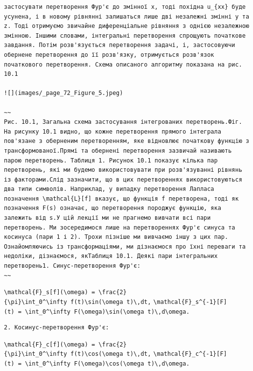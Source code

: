\documentclass[
  ukrainian,
]{article}
\begin{document}
\begin{verbatim}
застосувати перетворення Фур'є до змінної x, тоді похідна u_{xx} буде усунена, і в новому рівнянні залишаться лише дві незалежні змінні y та z. Тоді отримуємо звичайне диференціальне рівняння з однією незалежною змінною. Іншими словами, інтегральні перетворення спрощують початкове завдання. Потім розв'язується перетворення задачі, і, застосовуючи обернене перетворення до її розв'язку, отримується розв'язок початкового перетворення. Схема описаного алгоритму показана на рис. 10.1

![](images/_page_72_Figure_5.jpeg)

~~
Рис. 10.1, Загальна схема застосування інтегрованих перетворень.Фіг. На рисунку 10.1 видно, що кожне перетворення прямого інтеграла пов'язане з оберненим перетворенням, яке відновлює початкову функцію з трансформованої.Прямі та обернені перетворення зазвичай називають парою перетворень. Таблиця 1. Рисунок 10.1 показує кілька пар перетворень, які ми будемо використовувати при розв'язуванні рівнянь із факторами.Слід зазначити, що в цих перетвореннях використовуються два типи символів. Наприклад, у випадку перетворення Лапласа позначення \mathcal{L}[f] вказує, що функція f перетворена, тоді як позначення F(s) означає, що перетворення породжує функцію, яка залежить від s.У цій лекції ми не прагнемо вивчати всі пари перетворень. Ми зосередимося лише на перетвореннях Фур'є синуса та косинуса (пари 1 і 2). Трохи пізніше ми вивчаємо іншу з цих пар. Ознайомляючись із трансформаціями, ми дізнаємося про їхні переваги та недоліки, дізнаємося, якТаблиця 10.1. Деякі пари інтегральних перетворень1. Синус-перетворення Фур'є:
~~
\end{verbatim}

\texttt{\textbackslash{}mathcal\{F\}\_s{[}f{]}(\textbackslash{}omega)\ =\ \textbackslash{}frac\{2\}\{\textbackslash{}pi\}\textbackslash{}int\_0\^{}\textbackslash{}infty\ f(t)\textbackslash{}sin(\textbackslash{}omega\ t)\textbackslash{},dt,}
\texttt{\textbackslash{}mathcal\{F\}\_s\^{}\{-1\}{[}F{]}(t)\ =\ \textbackslash{}int\_0\^{}\textbackslash{}infty\ F(\textbackslash{}omega)\textbackslash{}sin(\textbackslash{}omega\ t)\textbackslash{},d\textbackslash{}omega.}

\begin{verbatim}
2. Косинус-перетворення Фур'є:
\end{verbatim}

\texttt{\textbackslash{}mathcal\{F\}\_c{[}f{]}(\textbackslash{}omega)\ =\ \textbackslash{}frac\{2\}\{\textbackslash{}pi\}\textbackslash{}int\_0\^{}\textbackslash{}infty\ f(t)\textbackslash{}cos(\textbackslash{}omega\ t)\textbackslash{},dt,}
\texttt{\textbackslash{}mathcal\{F\}\_c\^{}\{-1\}{[}F{]}(t)\ =\ \textbackslash{}int\_0\^{}\textbackslash{}infty\ F(\textbackslash{}omega)\textbackslash{}cos(\textbackslash{}omega\ t)\textbackslash{},d\textbackslash{}omega.}
\end{document}
